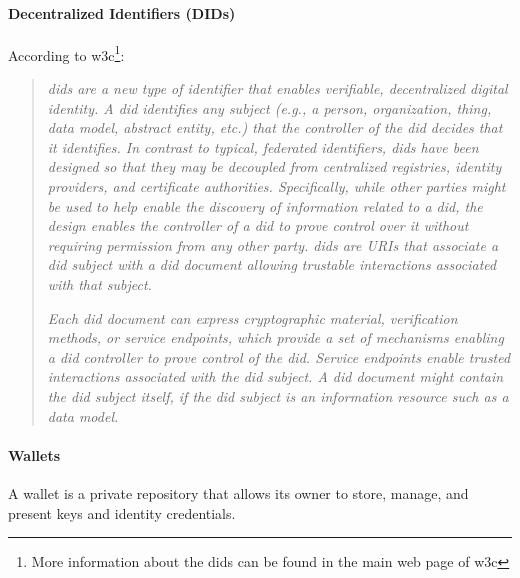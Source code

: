 \documentclass[a4paper, 12pt]{article} %
\begin{document}
                \paragraph{Decentralized Identifiers (DIDs)}
                    According to \acrshort{w3c}\cite{w3c-did}\footnote{More information about the \acrshort{dids} can be found in the main web page of \acrshort{w3c}\cite{w3c-did}}:
                    \begin{quote}
                        \textit{\acrfull{dids} are a new type of identifier that enables verifiable, decentralized digital identity. A \acrshort{did} identifies any subject (e.g., a person, organization, thing, data model, abstract entity, etc.) that the controller of the \acrshort{did} decides that it identifies. In contrast to typical, federated identifiers, \acrshort{dids} have been designed so that they may be decoupled from centralized registries, identity providers, and certificate authorities. Specifically, while other parties might be used to help enable the discovery of information related to a \acrshort{did}, the design enables the controller of a \acrshort{did} to prove control over it without requiring permission from any other party. \acrshort{dids} are URIs that associate a \acrshort{did} subject with a \acrshort{did} document allowing trustable interactions associated with that subject.}
                        
                        \textit{Each \acrshort{did} document can express cryptographic material, verification methods, or service endpoints, which provide a set of mechanisms enabling a \acrshort{did} controller to prove control of the \acrshort{did}. Service endpoints enable trusted interactions associated with the \acrshort{did} subject. A \acrshort{did} document might contain the \acrshort{did} subject itself, if the \acrshort{did} subject is an information resource such as a data model.}
                    \end{quote}
                    
                \paragraph{Wallets}
                    A wallet\cite{ssi-wallets} is a private repository that allows its owner to store, manage, and present keys and identity credentials.\\
                    
\end{document}

